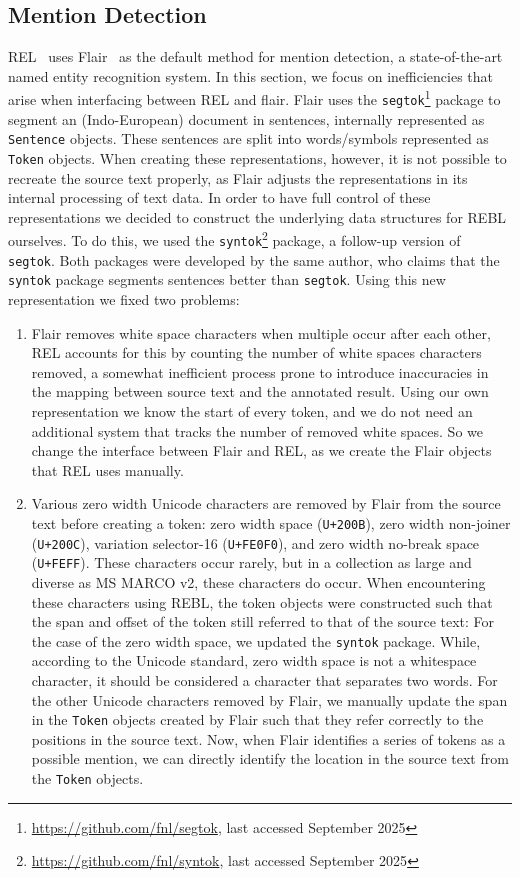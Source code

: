 \subsection{Mention Detection}
REL~\citep{rel} uses Flair~\citep{flair} as the default method for mention detection, a state-of-the-art named entity recognition system.
In this section, we focus on inefficiencies that arise when interfacing between REL and flair. 
Flair uses the \texttt{segtok}\footnote{\url{https://github.com/fnl/segtok}, last accessed September 2025} package to segment an (Indo-European) document in sentences, internally represented as \texttt{Sentence} objects. These sentences are split into words/symbols represented as \texttt{Token} objects.
When creating these representations, however, it is not possible to recreate the source text properly, as 
Flair adjusts the representations in its internal processing of text data. In order to have full control of these representations we decided to  construct the underlying data structures for REBL ourselves. To do this, we used the \texttt{syntok}\footnote{\url{https://github.com/fnl/syntok}, last accessed September 2025} package, a follow-up version of \texttt{segtok}.
Both packages were developed by the same author, who claims that the \texttt{syntok} package segments sentences better than \texttt{segtok}. 
Using this new representation we fixed two problems: 
\begin{enumerate}
	\item Flair removes white space characters when multiple occur after each other, REL accounts for this by counting the number of white spaces characters removed, a somewhat inefficient process prone to introduce inaccuracies in the mapping between source text and the annotated result. Using our own representation we know the start of every token, and we do not need an additional system that tracks the number of removed white spaces. So we change the interface between Flair and REL, as we create the Flair objects that REL uses manually. 
	\item Various zero width Unicode characters are removed by Flair from the source text before creating a token: zero width space (\texttt{U+200B}), zero width non-joiner (\texttt{U+200C}), variation selector-16 (\texttt{U+FE0F0}), and zero width no-break space (\texttt{U+FEFF}). 
	These characters occur rarely, but in a collection as large and diverse as MS MARCO v2, these characters do occur. When encountering these characters using REBL, the token objects were constructed such that the span and offset of the token still referred to that of the source text:
	For the case of the zero width space, we updated the \texttt{syntok} package. While, according to the Unicode standard, zero width space is not a whitespace character, it should be considered a character that separates two words. For the other Unicode characters removed by Flair, we manually update the span in the \texttt{Token} objects created by Flair such that they refer correctly to the positions in the source text. Now, when Flair identifies a series of tokens as a possible mention, we can directly identify the location in the source text from the \texttt{Token} objects.
\end{enumerate}

